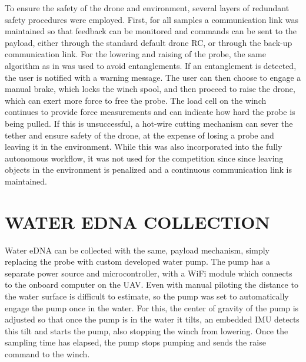 
    To ensure the safety of the drone and environment, several layers of redundant safety procedures were employed. First, for all samples a communication link was maintained so that feedback can be monitored and commands can be sent to the payload, either through the standard default drone RC, or through the back-up communication link. For the lowering and raising of the probe, the same algorithm as in \cite{} was used to avoid entanglements. If an entanglement is detected, the user is notified with a warning message. The user can then choose to engage a manual brake, which locks the winch spool, and then proceed to raise the drone, which can exert more force to free the probe. The load cell on the winch continues to provide force measurements and can indicate how hard the probe is being pulled. If this is unsuccessful, a hot-wire cutting mechanism can sever the tether and ensure safety of the drone, at the expense of losing a probe and leaving it in the environment. While this was also incorporated into the fully autonomous workflow, it was not used for the competition since since leaving objects in the environment is penalized and a continuous communication link is maintained.


    \section{WATER EDNA COLLECTION}

    Water eDNA can be collected with the same, payload mechanism, simply replacing the probe with custom developed water pump. The pump has a separate power source and microcontroller, with a WiFi module which connects to the onboard computer on the UAV. Even with manual piloting the distance to the water surface is difficult to estimate, so the pump was set to automatically engage the pump once in the water. For this, the center of gravity of the pump is adjusted so that once the pump is in the water it tilts, an embedded IMU detects this tilt and starts the pump, also stopping the winch from lowering. Once the sampling time has elapsed, the pump stops pumping and sends the raise command to the winch.

